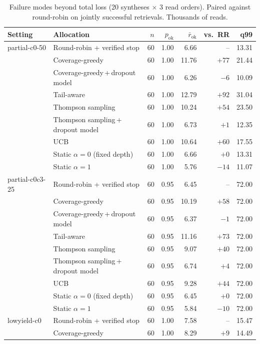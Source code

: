 \begin{table}[!t]
\centering
\caption{Failure modes beyond total loss (20 syntheses $\times$ 3 read orders).  Paired against round-robin on jointly successful retrievals.  Thousands of reads.}
\label{tab:r4fail}
\scriptsize
\setlength{\tabcolsep}{3pt}
\begin{tabular}{@{}llrrrrr@{}}
\toprule
Setting & Allocation & $n$ & $p_{\text{ok}}$ & $\bar r_{\text{ok}}$ & vs.\ RR & q99 \\
\midrule
partial-c0-50 & Round-robin + verified stop & 60 & 1.00 & 6.66 & -- & 13.31 \\
 & Coverage-greedy & 60 & 1.00 & 11.76 & $+77$ & 21.44 \\
 & Coverage-greedy\,+\,dropout model & 60 & 1.00 & 6.26 & $-6$ & 10.09 \\
 & Tail-aware & 60 & 1.00 & 12.79 & $+92$ & 31.04 \\
 & Thompson sampling & 60 & 1.00 & 10.24 & $+54$ & 23.50 \\
 & Thompson sampling\,+\,dropout model & 60 & 1.00 & 6.73 & $+1$ & 12.35 \\
 & UCB & 60 & 1.00 & 10.64 & $+60$ & 17.55 \\
 & Static $\alpha{=}0$ (fixed depth) & 60 & 1.00 & 6.66 & $+0$ & 13.31 \\
 & Static $\alpha{=}1$ & 60 & 1.00 & 5.76 & $-14$ & 11.07 \\
\midrule
partial-c0c3-25 & Round-robin + verified stop & 60 & 0.95 & 6.45 & -- & 72.00 \\
 & Coverage-greedy & 60 & 0.95 & 10.19 & $+58$ & 72.00 \\
 & Coverage-greedy\,+\,dropout model & 60 & 0.95 & 6.37 & $-1$ & 72.00 \\
 & Tail-aware & 60 & 0.95 & 11.16 & $+73$ & 72.00 \\
 & Thompson sampling & 60 & 0.95 & 9.07 & $+40$ & 72.00 \\
 & Thompson sampling\,+\,dropout model & 60 & 0.95 & 6.74 & $+4$ & 72.00 \\
 & UCB & 60 & 0.95 & 9.28 & $+44$ & 72.00 \\
 & Static $\alpha{=}0$ (fixed depth) & 60 & 0.95 & 6.45 & $+0$ & 72.00 \\
 & Static $\alpha{=}1$ & 60 & 0.95 & 5.84 & $-10$ & 72.00 \\
\midrule
lowyield-c0 & Round-robin + verified stop & 60 & 1.00 & 7.58 & -- & 15.47 \\
 & Coverage-greedy & 60 & 1.00 & 8.29 & $+9$ & 14.49 \\

\end{tabular}
\end{table}
